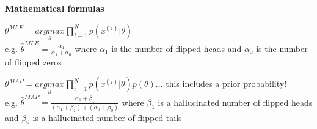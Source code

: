 \documentclass[letterpaper,fontsize=5pt]{scrartcl}
\renewenvironment{enumerate}[1]{\begin{compactenum}#1}{\end{compactenum}}
\theoremstyle{definition}
\begin{document}
\begin{multicols}{2}
\begin{enumerate}
\begin{enumerate}
			\end{enumerate}
		\item \textbf{Mathematical formulas}
			\begin{enumerate}
				\item $\theta^{MLE} = \underset{\theta}{argmax} \prod\limits_{i=1}^{N} p(x^{(i)}|\theta) $\\ e.g. $\hat{\theta}^{MLE} = \frac{\alpha_1}{\alpha_1 + \alpha_0}$ where $\alpha_1$ is the number of flipped heads and $\alpha_0$ is the number of flipped zeros
				\item $\theta^{MAP} = \underset{\theta}{argmax} \prod\limits_{i=1}^{N} p(x^{(i)}|\theta)p(\theta)...$ this includes a prior probability! \\ e.g. $\hat{\theta}^{MAP} = \frac{\alpha_1 + \beta_1}{(\alpha_1 + \beta_1) + (\alpha_0 + \beta_0)}$ where $\beta_1$ is a hallucinated number of flipped heads and $\beta_0$ is a hallucinated number of flipped tails
			\end{enumerate}
	\end{enumerate}

\end{multicols}
\end{document}
